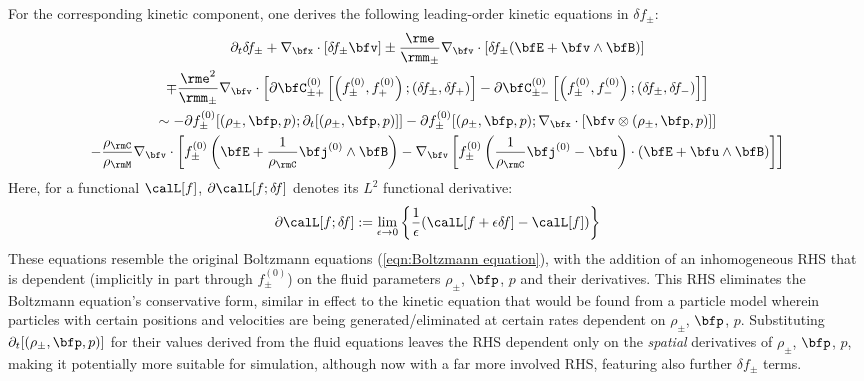     For the corresponding kinetic component, one derives the following leading-order kinetic equations in $\delta\! f_{\pm}$:
    \begin{multline}
        \partial_{t}\delta\! f_{\pm} + \nabla_{\bfx}\cdot[\delta\! f_{\pm}\bfv] \pm \frac{\rme}{\rmm_{\pm}}\nabla_{\bfv}\cdot[\delta\! f_{\pm}(\bfE + \bfv\wedge\bfB)]  \\
        \mp \frac{\rme^{2}}{\rmm_{\pm}}\nabla_{\bfv}\cdot\left[\partial\bfC_{\pm+}^{(0)}\left[\left(f_{\pm}^{(0)}, f_{+}^{(0)}\right); (\delta\! f_{\pm}, \delta\! f_{+})\right] - \partial\bfC_{\pm-}^{(0)}\left[\left(f_{\pm}^{(0)}, f_{-}^{(0)}\right); (\delta\! f_{\pm}, \delta\! f_{-})\right]\right]  \\
        \sim  - \partial f_{\pm}^{(0)}[(\rho_{\pm}, \bfp, p); \partial_{t}[(\rho_{\pm}, \bfp, p)]] - \partial f_{\pm}^{(0)}[(\rho_{\pm}, \bfp, p); \nabla_{\bfx}\cdot[\bfv\otimes(\rho_{\pm}, \bfp, p)]]  \\
        - \frac{\rho_{\rmC}}{\rho_{\rmM}}\nabla_{\bfv}\cdot\left[f_{\pm}^{(0)}\left(\bfE + \frac{1}{\rho_{\rmC}}\bfj^{(0)}\wedge\bfB\right) - \nabla_{\bfv}\left[f_{\pm}^{(0)}\left(\frac{1}{\rho_{\rmC}}\bfj^{(0)} - \bfu\right)\cdot\left(\bfE + \bfu\wedge\bfB\right)\right]\right]
    \end{multline}
    Here, for a functional $\calL[f]$, $\partial\calL[f; \delta\! f]$ denotes its $L^{2}$ functional derivative:
    \begin{equation}
        \partial\calL[f; \delta\! f]  :=  \lim_{\epsilon \rightarrow 0}\left\{\frac{1}{\epsilon}(\calL[f + \epsilon\delta\! f] - \calL[f])\right\}
    \end{equation}
    These equations resemble the original Boltzmann equations (\ref{eqn:Boltzmann equation}), with the addition of an inhomogeneous RHS that is dependent (implicitly in part through $f_{\pm}^{(0)}$) on the fluid parameters $\rho_{\pm}$, $\bfp$, $p$ and their derivatives. This RHS eliminates the Boltzmann equation's conservative form, similar in effect to the kinetic equation that would be found from a particle model wherein particles with certain positions and velocities are being generated/eliminated at certain rates dependent on $\rho_{\pm}$, $\bfp$, $p$. Substituting $\partial_{t}[(\rho_{\pm}, \bfp, p)]$ for their values derived from the fluid equations leaves the RHS dependent only on the \emph{spatial} derivatives of $\rho_{\pm}$, $\bfp$, $p$, making it potentially more suitable for simulation, although now with a far more involved RHS, featuring also further $\delta\! f_{\pm}$ terms.

